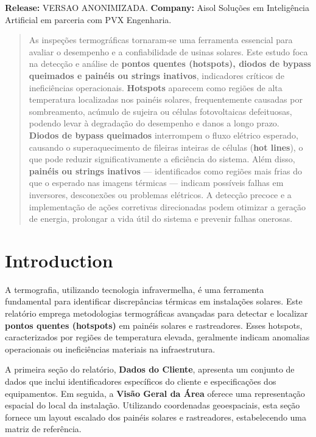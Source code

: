 \documentclass[dvipsnames]{article}%
\begin{document}
\textbf{Release:}%
VERSAO ANONIMIZADA.  %
\textbf{Company:}%
Aisol Soluções em Inteligência Artificial em parceria com PVX Engenharia.  %
\newpage%
\tableofcontents%
\newpage%
\newpage%
\begin{abstract}%
As inspeções termográficas tornaram-se uma ferramenta essencial para avaliar o desempenho e a confiabilidade de usinas solares. Este estudo foca na detecção e análise de \textbf{pontos quentes (hotspots), diodos de bypass queimados e painéis ou strings inativos}, indicadores críticos de ineficiências operacionais. \textbf{Hotspots} aparecem como regiões de alta temperatura localizadas nos painéis solares, frequentemente causadas por sombreamento, acúmulo de sujeira ou células fotovoltaicas defeituosas, podendo levar à degradação do desempenho e danos a longo prazo. \textbf{Diodos de bypass queimados} interrompem o fluxo elétrico esperado, causando o superaquecimento de fileiras inteiras de células (\textbf{hot lines}), o que pode reduzir significativamente a eficiência do sistema. Além disso, \textbf{painéis ou strings inativos} — identificados como regiões mais frias do que o esperado nas imagens térmicas — indicam possíveis falhas em inversores, desconexões ou problemas elétricos. A detecção precoce e a implementação de ações corretivas direcionadas podem otimizar a geração de energia, prolongar a vida útil do sistema e prevenir falhas onerosas.%
\end{abstract}%
\pagestyle{fancy}%
\section{Introduction}%
A termografia, utilizando tecnologia infravermelha, é uma ferramenta fundamental para identificar discrepâncias térmicas em instalações solares. Este relatório emprega metodologias termográficas avançadas para detectar e localizar \textbf{pontos quentes (hotspots)} em painéis solares e rastreadores. Esses hotspots, caracterizados por regiões de temperatura elevada, geralmente indicam anomalias operacionais ou ineficiências materiais na infraestrutura. 

A primeira seção do relatório, \textbf{Dados do Cliente}, apresenta um conjunto de dados que inclui identificadores específicos do cliente e especificações dos equipamentos. Em seguida, a \textbf{Visão Geral da Área} oferece uma representação espacial do local da instalação. Utilizando coordenadas geoespaciais, esta seção fornece um layout escalado dos painéis solares e rastreadores, estabelecendo uma matriz de referência. 
\end{document}
